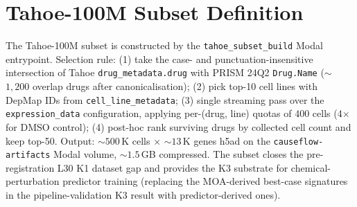 \documentclass{article}
\begin{document}
\section{Tahoe-100M Subset Definition}
\label{app:tahoe}

The Tahoe-100M subset is constructed by the \texttt{tahoe\_subset\_build} Modal entrypoint. Selection rule: (1) take the case- and punctuation-insensitive intersection of Tahoe \texttt{drug\_metadata.drug} with PRISM 24Q2 \texttt{Drug.Name} ($\sim$$1{,}200$ overlap drugs after canonicalisation); (2) pick top-10 cell lines with DepMap IDs from \texttt{cell\_line\_metadata}; (3) single streaming pass over the \texttt{expression\_data} configuration, applying per-(drug, line) quotas of 400 cells (4$\times$ for DMSO control); (4) post-hoc rank surviving drugs by collected cell count and keep top-50. Output: ${\sim}500$\,K cells $\times$ ${\sim}13$\,K genes h5ad on the \texttt{causeflow-artifacts} Modal volume, ${\sim}1.5$\,GB compressed. The subset closes the pre-registration L30 K1 dataset gap and provides the K3 substrate for chemical-perturbation predictor training (replacing the MOA-derived best-case signatures in the pipeline-validation K3 result with predictor-derived ones).



\end{document}
